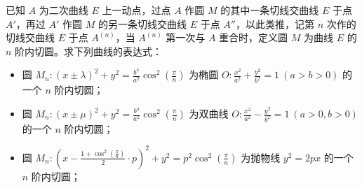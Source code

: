 \begin{exercise}
已知 \(A\) 为二次曲线 \(E\) 上一动点，过点 \(A\) 作圆 \(M\) 的其中一条切线交曲线 \(E\) 于点 \(A'\)，再过 \(A'\) 作圆 \(M\) 的另一条切线交曲线 \(E\) 于点 \(A''\)，以此类推，记第 \(n\) 次作的切线交曲线 \(E\) 于点 \(A^{(n)}\)，当 \(A^{(n)}\) 第一次与 \(A\) 重合时，定义圆 \(M\) 为曲线 \(E\) 的 \(n\) 阶内切圆。求下列曲线的表达式：
\begin{itemize}
\item 圆 \(M_n: (x \pm \lambda)^2 + y^2 = \frac{b^4}{a^2}\cos^2\left(\frac{\pi}{n}\right)\) 为椭圆 \(O: \frac{x^2}{a^2} + \frac{y^2}{b^2} = 1\ (a > b > 0)\) 的一个 \(n\) 阶内切圆；
\item 圆 \(M_n: (x \pm \mu)^2 + y^2 = \frac{b^4}{a^2}\cos^2\left(\frac{\pi}{n}\right)\) 为双曲线 \(O: \frac{x^2}{a^2} - \frac{y^2}{b^2} = 1\ (a > 0, b > 0)\) 的一个 \(n\) 阶内切圆；
\item 圆 \(M_n: \left(x - \frac{1 + \cos^2\left(\frac{\pi}{n}\right)}{2} \cdot p\right)^2 + y^2 = p^2\cos^2\left(\frac{\pi}{n}\right)\) 为抛物线 \(y^2 = 2px\) 的一个 \(n\) 阶内切圆；
\end{itemize}
\end{exercise}
